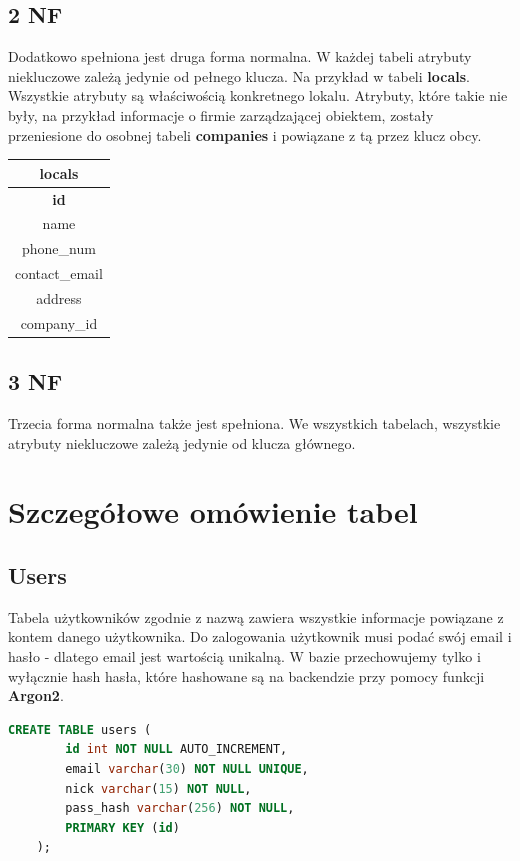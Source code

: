 \documentclass{report}
\begin{document}
\subsection*{2 NF}
Dodatkowo spełniona jest druga forma normalna. 
W każdej tabeli atrybuty niekluczowe zależą jedynie od pełnego klucza.
Na przykład w tabeli \textbf{locals}. Wszystkie atrybuty są właściwością 
konkretnego lokalu. Atrybuty, które takie nie były, na przykład informacje
o firmie zarządzającej obiektem, zostały przeniesione do osobnej tabeli \textbf{companies}
i powiązane z tą przez klucz obcy.
\begin{center}
\begin{tabular}{|c|}
    \hline
    \textbf{locals} \\
    \hline \hline
    \textbf{id} \\
    \hline
    name \\
    \hline
    phone\_num \\
    \hline
    contact\_email \\
    \hline
    address \\
    \hline
    company\_id \\
    \hline
\end{tabular}
\end{center}

\subsection*{3 NF}
Trzecia forma normalna także jest spełniona. We wszystkich tabelach,
wszystkie atrybuty niekluczowe zależą jedynie od klucza głównego.

\section*{Szczegółowe omówienie tabel}
\subsection*{Users}
Tabela użytkowników zgodnie z nazwą zawiera wszystkie informacje
powiązane z kontem danego użytkownika. Do zalogowania użytkownik
musi podać swój email i hasło - dlatego email jest wartością
unikalną. W bazie przechowujemy tylko i wyłącznie hash hasła,
które hashowane są na backendzie przy pomocy funkcji \textbf{Argon2}.
\begin{lstlisting}[language=SQL]
    CREATE TABLE users (
        id int NOT NULL AUTO_INCREMENT,
        email varchar(30) NOT NULL UNIQUE, 
        nick varchar(15) NOT NULL,
        pass_hash varchar(256) NOT NULL,
        PRIMARY KEY (id)
    );
\end{lstlisting}
\end{document}
